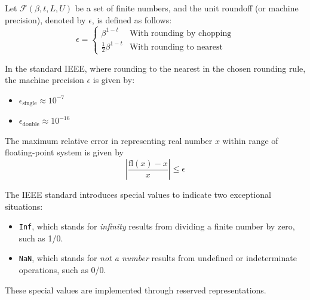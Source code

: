 \documentclass{article}
\begin{document}
\begin{definition}
    Let $\mathcal{F}(\beta,t,L,U)$ be a set of finite numbers, and the unit
    roundoff (or machine precision), denoted by $\epsilon$, is defined as
    follows:
    $$
    \epsilon=\begin{cases}
        \beta^{1-t} & \text{With rounding by chopping}\\ 
        \frac{1}{2}\beta^{1-t} & \text{With rounding to nearest}
    \end{cases}
    $$
\end{definition}
In the standard IEEE, where rounding to the nearest in the chosen rounding
rule, the machine precision $\epsilon$ is given by:
\begin{itemize}
    \item $\epsilon_{\text{single}}\approx10^{-7}$
    \item $\epsilon_{\text{double}}\approx10^{-16}$
\end{itemize}
\begin{theorem}
    The maximum relative error in representing real number $x$ within range of
    floating-point system is given by
    $$\left\lvert \frac{\text{fl}(x)-x}{x} \right\rvert\leq\epsilon$$
\end{theorem}
The IEEE standard introduces special values to indicate two exceptional
situations:
\begin{itemize}
    \item \texttt{Inf}, which stands for \textit{infinity} results from
        dividing a finite number by zero, such as 1/0.
    \item \texttt{NaN}, which stands for \textit{not a number} results from
        undefined or indeterminate operations, such as 0/0.
\end{itemize}
These special values are implemented through reserved representations.
\end{document}
